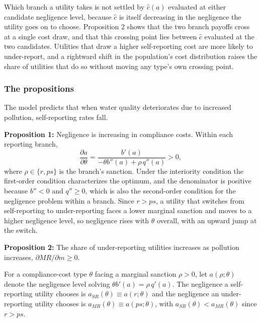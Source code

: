 \documentclass[12pt]{article}
\begin{document}
    Which branch a utility takes is not settled by $\hat{c}(a)$ evaluated at either candidate negligence level, because $\hat{c}$ is itself decreasing in the negligence the utility goes on to choose. Proposition 2 shows that the two branch payoffs cross at a single cost draw, and that this crossing point lies between $\hat{c}$ evaluated at the two candidates. Utilities that draw a higher self-reporting cost are more likely to under-report, and a rightward shift in the population's cost distribution raises the share of utilities that do so without moving any type's own crossing point.
	
	\subsubsection{The propositions}
	
	The model predicts that when water quality deteriorates due to increased pollution, self-reporting rates fall.
	
	\textbf{Proposition 1:} Negligence is increasing in compliance costs. Within each reporting branch,
    \[\frac{\partial a}{\partial\theta} = \frac{b'(a)}{-\theta b''(a) + \rho\, q''(a)} > 0,\]
    where $\rho \in \{r, ps\}$ is the branch's sanction. Under the interiority condition the first-order condition characterizes the optimum, and the denominator is positive because $b'' < 0$ and $q'' \ge 0$, which is also the second-order condition for the negligence problem within a branch. Since $r > ps$, a utility that switches from self-reporting to under-reporting faces a lower marginal sanction and moves to a higher negligence level, so negligence rises with $\theta$ overall, with an upward jump at the switch.
	
	\textbf{Proposition 2:} The share of under-reporting utilities increases as pollution increases, $\partial MR/\partial m \ge 0$.

    For a compliance-cost type $\theta$ facing a marginal sanction $\rho > 0$, let $a(\rho;\theta)$ denote the negligence level solving $\theta b'(a) = \rho\,q'(a)$. The negligence a self-reporting utility chooses is $a_{SR}(\theta) \equiv a(r;\theta)$ and the negligence an under-reporting utility chooses is $a_{MR}(\theta) \equiv a(ps;\theta)$, with $a_{SR}(\theta) < a_{MR}(\theta)$ since $r > ps$.
\end{document}
